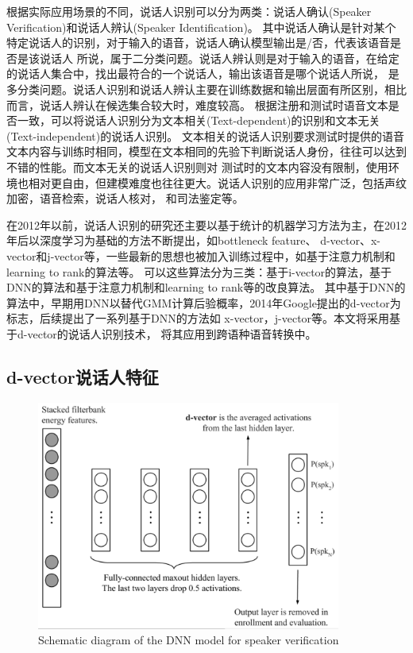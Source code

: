 根据实际应用场景的不同，说话人识别可以分为两类：说话人确认(Speaker Verification)和说话人辨认(Speaker Identification)。
其中说话人确认是针对某个特定说话人的识别，对于输入的语音，说话人确认模型输出是/否，代表该语音是否是该说话人
所说，属于二分类问题。说话人辨认则是对于输入的语音，在给定的说话人集合中，找出最符合的一个说话人，输出该语音是哪个说话人所说，
是多分类问题。说话人识别和说话人辨认主要在训练数据和输出层面有所区别，相比而言，说话人辨认在候选集合较大时，难度较高。
根据注册和测试时语音文本是否一致，可以将说话人识别分为文本相关(Text-dependent)的识别和文本无关(Text-independent)的说话人识别。
文本相关的说话人识别要求测试时提供的语音文本内容与训练时相同，模型在文本相同的先验下判断说话人身份，往往可以达到不错的性能。而文本无关的说话人识别则对
测试时的文本内容没有限制，使用环境也相对更自由，但建模难度也往往更大。说话人识别的应用非常广泛，包括声纹加密，语音检索，说话人核对，
和司法鉴定等。

在2012年以前，说话人识别的研究还主要以基于统计的机器学习方法为主，在2012年后以深度学习为基础的方法不断提出，如bottleneck feature、
d-vector、x-vector和j-vector等，一些最新的思想也被加入训练过程中，如基于注意力机制和learning to rank的算法等。
可以这些算法分为三类：基于i-vector的算法，基于DNN的算法和基于注意力机制和learning to rank等的改良算法。
其中基于DNN的算法中，早期用DNN以替代GMM计算后验概率，2014年Google提出的d-vector为标志\cite{variani2014deep}，后续提出了一系列基于DNN的方法如
x-vector，j-vector等\cite{snyder2016deep,chen2015multi,shi2017double}。本文将采用基于d-vector的说话人识别技术，
将其应用到跨语种语音转换中。

\subsection{d-vector说话人特征}

\begin{figure}[!htp]
    \centering
    \includegraphics[width=10cm,trim=0 10 0 0,clip]{figure/5_dvector.png}
    {Schematic diagram of the DNN model for speaker verification}
    \label{fig:dvector}
\end{figure}


